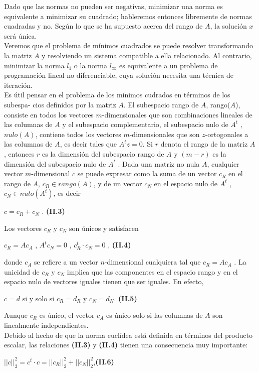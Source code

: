 \documentclass[twocolumn,twoside]{article}
\begin{document}
Dado que las normas no pueden ser negativas, minimizar una norma es equivalente a
minimizar su cuadrado; hableremos entonces libremente de normas cuadradas y no. Seg\'un
lo que se ha supuesto acerca del rango de $A$, la soluci\'on $x$ ser\'a \'unica.\\
Veremos que el problema de m\'inimos cuadrados se puede resolver transformando la
matriz $A$ y resolviendo un sistema compatible a ella relacionado. Al contrario, minimizar
la norma $l_1$ o la norma $l_\infty$ es equivalente a un problema de programaci\'on lineal no
diferenciable, cuya soluci\'on necesita una t\'ecnica de iteraci\'on.\\
Es \'util pensar en el problema de los m\'inimos cudrados en t\'erminos de los subespa-
cios definidos por la matriz $A$. El subespacio rango de $A$, rango($A$), consiste en todos
los vectores $m$-dimensionales que son combinaciones lineales de las columnas de $A$ y el
subespacio complementario, el subespacio nulo de $A^t$ , $nulo(A)$, contiene todos los vectores
$m$-dimensionales que son $z$-ortogonales a las columnas de $A$, es decir tales que $A^t z = 0$.
Si $r$ denota el rango de la matriz $A$, entonces $r$ es la dimensi\'on del subespacio rango de
$A$ y $(m - r)$ es la dimensi\'on del subespacio nulo de $A^t$ .
Dada una matriz no nula $A$, cualquier vector $m$-dimensional $c$ se puede expresar
como la suma de un vector $c_R$ en el rango de $A$, $c_R \in rango(A)$, y de un vector $c_N$ en el
espacio nulo de $A^t$ , $c_N \in nulo(A^t )$, es decir
\begin{center}
  $c = c_R + c_N$ .\hspace{2.5cm} \textbf{(II.3)}
\end{center}
Los vectores $c_R$ y $c_N$ son \'unicos y satisfacen
\begin{center}
  $c_R = A c_A$ , $A^t c_N = 0$ , $c_{R}^{t} \cdot c_N = 0$ , \hspace{0.25cm} \textbf{(II.4)}
\end{center}
donde $c_A$ se refiere a un vector $n$-dimensional cualquiera tal que $c_R = A c_A$ . La unicidad
de $c_R$ y $c_N$ implica que las componentes en el espacio rango y en el espacio nulo de
vectores iguales tienen que ser iguales. En efecto,
\begin{center}
  $c = d$ si y solo si $c_R = d_R$ y $c_N = d_N$.  \textbf{(II.5)}
\end{center}

Aunque $c_R$ es \'unico, el vector $c_A$ es \'unico solo si las columnas de $A$ son linealmente
independientes.\\
Debido al hecho de que la norma eucl\'idea est\'a definida en t\'erminos del producto
escalar, las relaciones \textbf{(II.3)} y \textbf{(II.4)} tienen una consecuencia muy importante:
\begin{center}
  $||c||_2^2 = c^t\cdot c = ||c_R ||_2^2 + ||c_N ||_2^2$,\hspace{0.5cm}\textbf{(II.6)}
\end{center}
\end{document}
